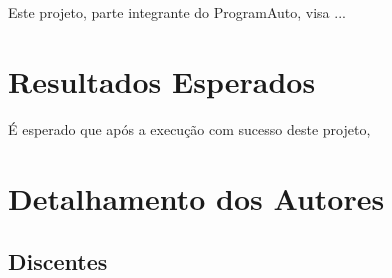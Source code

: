 \documentclass[a4paper,12pt]{article} %
\begin{document}
Este projeto, parte integrante do ProgramAuto, visa ...



\section{Resultados Esperados}

É esperado que após a execução com sucesso deste projeto,

\section*{Detalhamento dos Autores}

\subsection*{Discentes}
\end{document}
